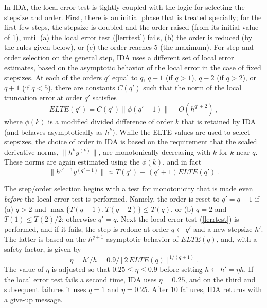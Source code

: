 In IDA, the local error test is tightly coupled with the logic for
selecting the stepsize and order.  First, there is an initial phase
that is treated specially; for the first few steps, the stepsize is
doubled and the order raised (from its initial value of 1), until (a)
the local error test (\ref{lerrtest}) fails, (b) the order is reduced
(by the rules given below), or (c) the order reaches 5 (the maximum).
For step and order selection on the general step, IDA uses a different
set of local error estimates, based on the asymptotic behavior of the
local error in the case of fixed stepsizes.  At each of the orders
$q'$ equal to $q$, $q-1$ (if $q > 1$), $q-2$ (if $q > 2$), or $q+1$
(if $q < 5$), there are constants $C(q')$ such that the norm of the
local truncation error at order $q'$ satisfies
\[ ELTE(q') = C(q') \| \phi(q'+1) \| + O(h^{q'+2}) \, , \]
where $\phi(k)$ is a modified divided difference of order $k$ that is
retained by IDA (and behaves asymptotically as $h^k$).
While the ELTE values are used to select stepsizes, the choice of
order in IDA is based on the requirement that the scaled derivative
norms, $\|h^k y^{(k)}\|$, are monotonically decreasing with $k$ for
$k$ near $q$.  These norms are again estimated using the $\phi(k)$,
and in fact 
\[ \|h^{q'+1} y^{(q'+1)}\| \approx T(q') \equiv (q'+1) ELTE(q') \, . \]

The step/order selection begins with a test for monotonicity that is
made even {\em before} the local error test is performed.  Namely,
the order is reset to $q' = q-1$ if (a) $q > 2$ and
$\max\{T(q-1),T(q-2)\} \leq T(q)$, or (b) $q=2$ and $T(1)\leq T(2)/2$;
otherwise $q' = q$.  Next the local error test (\ref{lerrtest}) is
performed, and if it fails, the step is redone at order $q\leftarrow q'$
and a new stepsize $h'$.  The latter is based on the $h^{q+1}$
asymptotic behavior of $ELTE(q)$, and, with a safety factor, is
given by
\[ \eta = h'/h = 0.9/[2 \, ELTE(q)]^{1/(q+1)} \, . \]
The value of $\eta$ is adjusted so that $0.25 \leq \eta \leq 0.9$
before setting $h \leftarrow h' = \eta h$.  If the local error test
fails a second time, IDA uses $\eta = 0.25$, and on the third
and subsequent failures it uses $q = 1$ and $\eta = 0.25$.  After
10 failures, IDA returns with a give-up message.

